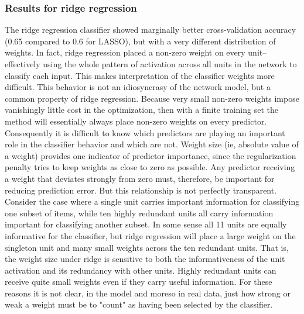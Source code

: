 \subsubsection{Results for ridge regression}

The ridge regression classifier showed marginally better cross-validation accuracy (0.65 compared to 0.6 for LASSO), but with a very different distribution of weights. In fact, ridge regression placed a non-zero weight on every unit--effectively using the whole pattern of activation across all units in the network to classify each input. This makes interpretation of the classifier weights more difficult. This behavior is not an idiosyncrasy of the network model, but a common property of ridge regression. Because very small non-zero weights impose vanishingly little cost in the optimization, then with a finite training set the method will essentially always place non-zero weights on every predictor. Consequently it is difficult to know which predictors are playing an important role in the classifier behavior and which are not. Weight size (ie, absolute value of a weight) provides one indicator of predictor importance, since the regularization penalty tries to keep weights as close to zero as possible. Any predictor receiving a weight that deviates strongly from zero must, therefore, be important for reducing prediction error. But this relationship is not perfectly transparent. Consider the case where a single unit carries important information for classifying one subset of items, while ten highly redundant units all carry information important for classifying another subset. In some sense all 11 units are equally informative for the classifier, but ridge regression will place a large weight on the singleton unit and many small weights across the ten redundant units. That is, the weight size under ridge is sensitive to both the informativeness of the unit activation and its redundancy with other units. Highly redundant units can receive quite small weights even if they carry useful information. For these reasons it is not clear, in the model and moreso in real data, just how strong or weak a weight must be to "count" as having been selected by the classifier. 

